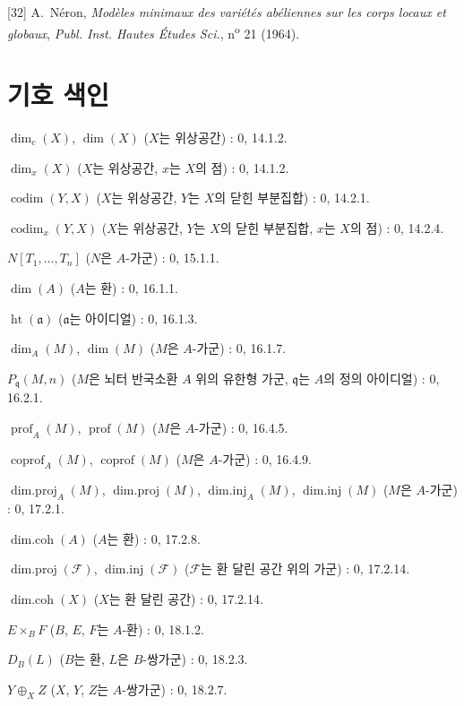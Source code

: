 [32] A.~Néron, \emph{Modèles minimaux des variétés abéliennes sur les corps
locaux et globaux}, \emph{Publ. Inst. Hautes Études Sci.}, n\textsuperscript{o}
21 (1964).

\clearpage
{}
{}
\section*{기호 색인}

$\dim_c(X)$, $\dim(X)$ ($X$는 위상공간) : 0, 14.1.2.\par
$\dim_x(X)$ ($X$는 위상공간, $x$는 $X$의 점) : 0, 14.1.2.\par
$\operatorname{codim}(Y,X)$ ($X$는 위상공간, $Y$는 $X$의 닫힌 부분집합) : 0, 14.2.1.\par
$\operatorname{codim}_x(Y,X)$ ($X$는 위상공간, $Y$는 $X$의 닫힌 부분집합, $x$는 $X$의 점) : 0, 14.2.4.\par
$N[T_1,\ldots,T_n]$ ($N$은 $A$-가군) : 0, 15.1.1.\par
$\dim(A)$ ($A$는 환) : 0, 16.1.1.\par
$\operatorname{ht}(\mathfrak a)$ ($\mathfrak a$는 아이디얼) : 0, 16.1.3.\par
$\dim_A(M)$, $\dim(M)$ ($M$은 $A$-가군) : 0, 16.1.7.\par
$P_{\mathfrak q}(M,n)$ ($M$은 뇌터 반국소환 $A$ 위의 유한형 가군,
$\mathfrak q$는 $A$의 정의 아이디얼) : 0, 16.2.1.\par
$\operatorname{prof}_A(M)$, $\operatorname{prof}(M)$ ($M$은 $A$-가군) : 0, 16.4.5.\par
$\operatorname{coprof}_A(M)$, $\operatorname{coprof}(M)$ ($M$은 $A$-가군) : 0, 16.4.9.\par
$\operatorname{dim.proj}_A(M)$, $\operatorname{dim.proj}(M)$,
$\operatorname{dim.inj}_A(M)$, $\operatorname{dim.inj}(M)$ ($M$은 $A$-가군) : 0, 17.2.1.\par
$\operatorname{dim.coh}(A)$ ($A$는 환) : 0, 17.2.8.\par
$\operatorname{dim.proj}(\mathscr F)$, $\operatorname{dim.inj}(\mathscr F)$
($\mathscr F$는 환 달린 공간 위의 가군) : 0, 17.2.14.\par
$\operatorname{dim.coh}(X)$ ($X$는 환 달린 공간) : 0, 17.2.14.\par
$E\times_B F$ ($B$, $E$, $F$는 $A$-환) : 0, 18.1.2.\par
$D_B(L)$ ($B$는 환, $L$은 $B$-쌍가군) : 0, 18.2.3.\par
$Y\oplus_X Z$ ($X$, $Y$, $Z$는 $A$-쌍가군) : 0, 18.2.7.\par
